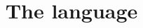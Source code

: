 \documentclass[12pt, a4paper]{article}
\title{The \core{} language}
\author{}
\date{}
\begin{document}

\nocite{*} 

\maketitle

\ottall
\end{document}
